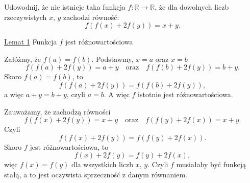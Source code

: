 \vspace{5px}

\begin{problem}{10}
	Udowodnij, że nie istnieje taka funkcja $f:\mathbb{R}\longrightarrow\mathbb{R}$, że dla dowolnych liczb rzeczywistych $x$, $y$ zachodzi równość:
	\[
		f(f(x) + 2f(y)) = x + y.
	\]
\end{problem}

\noindent
\underline{Lemat 1} Funkcja $f$ jest różnowartościowa

Załóżmy, że $f(a) = f(b)$. Podstawmy, $x=a$ oraz $x = b$
\[
	f(f(a) + 2f(y)) = a + y \quad \text{oraz} \quad f(f(b) + 2f(y)) = b + y.
\] 
Skoro $f(a)=f(b)$, to 
\[
	f(f(a) + 2f(y)) = f(f(b) + 2f(y)),
\] 
a więc $a + y = b + y$, czyli $a = b$. A więc $f$ istotnie jest różnowartościowa.
\vspace{10px}

\noindent
Zauważamy, że zachodzą równości
\[
	f(f(x) + 2f(y)) = x + y \quad \text{oraz} \quad f(f(y)+2f(x))=x+y.
\]
Czyli 
\[
	f(f(x) + 2f(y)) = f(f(y) + 2f(x)).
\] 
Skoro $f$ jest różnowartościowa, to 
\[
	f(x)+2f(y)=f(y)+2f(x),
\]
więc $f(x)=f(y)$ dla wszystkich liczb $x$, $y$. Czyli $f$ musiałaby być funkcją stałą, a to jest oczywista sprzeczność z danym równaniem.
